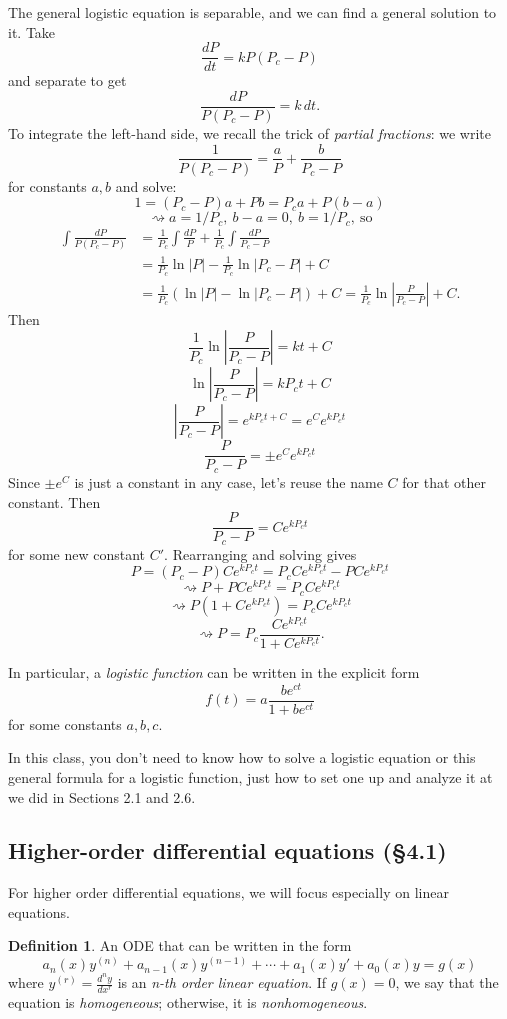 \documentclass[12pt]{amsart}
\numberwithin{equation}{section}
\theoremstyle{plain} %
\newcommand{\rsa}{\rightsquigarrow}
\theoremstyle{definition}
\newtheorem{defn}[equation]{Definition}
\theoremstyle{remark}
\begin{document}
The general logistic equation is separable, and we can find a general solution to it. Take
\[ \frac{dP}{dt} = k P (P_{c} - P)\]
and separate to get
\[\frac{dP}{P(P_c - P)} = k \, dt.\]
To integrate the left-hand side, we recall the trick of \emph{partial fractions}:
we write
\[ \frac{1}{P(P_c - P)} = \frac{a}{P} + \frac{b}{P_c - P}\] for constants $a,b$ and solve:
\[ 1 = (P_c - P)a + P b = P_c a + P (b-a) \]
\[ \rsa a = 1/P_c, \ b-a = 0 ,\ b=1/P_c, \ \text{so}\]
\begin{align*} \int \frac{dP}{P(P_c - P)} &= \frac{1}{P_c} \int \frac{dP}{P} + \frac{1}{P_c} \int \frac{dP}{P_c - P} \\&= \frac{1}{P_c} \ln|P| -  \frac{1}{P_c} \ln|P_c - P| +C 
\\&= \frac{1}{P_c} (\ln|P| - \ln|P_c - P|) +C = \frac{1}{P_c} \ln \left| \frac{P}{P_c - P} \right| +C.\end{align*}
Then \[\frac{1}{P_c} \ln \left| \frac{P}{P_c - P} \right|  = kt +C\]
\[ \ln \left| \frac{P}{P_c - P} \right| = k P_c t + C\]
\[ \left| \frac{P}{P_c - P} \right| = e^{k P_c t + C} =  e^C e^{k P_c t }\]
\[ \frac{P}{P_c - P}  =   \pm e^C e^{k P_c t } \]
Since $\pm e^C$ is just a constant in any case, let's reuse the name $C$ for that other constant. Then
\[ \frac{P}{P_c - P}  = C e^{k P_c t } \]
for some new constant $C'$.
Rearranging and solving gives
\[ P = (P_c - P) C e^{k P_c t } = P_c C e^{k P_c t }  - P  C e^{k P_c t } \]
\[ \rsa P + P C e^{k P_c t }  = P_c C e^{k P_c t } \]
\[ \rsa P (1 +C e^{k P_c t } ) = P_c C e^{k P_c t } \]
\[ \rsa P = P_c \frac{C e^{k P_c t }}{1+ C e^{k P_c t }}.\]

In particular, a \emph{logistic function} can be written in the explicit form
\[ f(t) = a \frac{ b e^{ct}}{1+ b e^{ct}}\]
for some constants $a,b,c$.

In this class, you don't need to know how to solve a logistic equation or this general formula for a logistic function, just how to set one up and analyze it at we did in Sections 2.1 and 2.6.

\subsection*{Higher-order differential equations (\S4.1)}

For higher order differential equations, we will focus especially on linear equations.

\begin{defn} An ODE that can be written in the form
\[ a_n(x) y^{(n)} + a_{n-1}(x) y^{(n-1)} + \cdots + a_1(x) y' + a_0(x) y = g(x)\]
where $y^{(r)} = \frac{d^n y}{dx^r}$ is an \emph{n-th order linear equation}. If $g(x)=0$, we say that the equation is \emph{homogeneous}; otherwise, it is \emph{nonhomogeneous}.
\end{defn}
\end{document}
